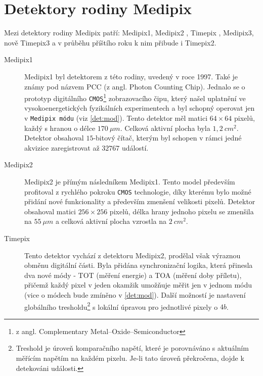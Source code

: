 \section{Detektory rodiny Medipix}\label{det:med}
Mezi detektory rodiny Medipix patří: Medipix1, Medipix2 \cite{Llopart-medipix2}, Timepix \cite{Llopart2008106}, Medipix3, nově Timepix3 \cite{timepix3} a v průběhu příštího roku k nim přibude i Timepix2. 

\begin{description}
	\item[Medipix1] Medipix1 byl detektorem z této rodiny, uvedený v roce 1997. Také je známy pod názvem PCC (z angl. Photon Counting Chip). Jednalo se o prototyp digitálního \texttt{CMOS}\footnote{z angl. Complementary Metal–Oxide–Semiconductor} zobrazovacího čipu, který našel uplatnění ve vysokoenergetických fyzikálních experimentech \cite{medipix-www} a byl schopný operovat jen v \texttt{Medipix módu} (viz \ref{det:mod}). Tento detektor měl matici $64\times64$ pixelů, každý s hranou o délce $170~\mu m$. Celková aktivní plocha byla $1,2~cm^2$. Detektor obsahoval $15$-bitový čítač, kterým byl schopen v rámci jedné akvizice zaregistrovat až $32767$ událostí.

	\item[Medipix2] Medipix2 je přímým následníkem Medipix1. Tento model především profitoval z rychlého pokroku \texttt{CMOS} technologie, díky kterému bylo možné přidání nové funkcionality a především zmenšení velikosti pixelů. Detektor obsahoval matici $256\times256$ pixelů, délka hrany jednoho pixelu se zmenšila na $55~\mu m$ a celková aktivní plocha vzrostla na $2~cm^2$.

	\item[Timepix]\label{det:tim} Tento detektor vychází z detektoru Medipix2, prodělal však výraznou obměnu digitální části. Byla přidána synchronizační logika, která přinesla dva nové módy - TOT (měření energie) a TOA (měření doby příletu), přičemž každý pixel v jeden okamžik umožňuje měřit jen v jednom módu
	(vice o módech bude zmíněno v \ref{det:mod}). Další možností je nastavení globálního tresholdu\footnote{Treshold je úroveň komparačního napětí, které je porovnáváno s aktuálním měřícím napětím na každém pixelu. Je-li tato úroveň překročena, dojde k detekováni události.} s lokální úpravou pro jednotlivé pixely o $4 b$. 


\end{description}

